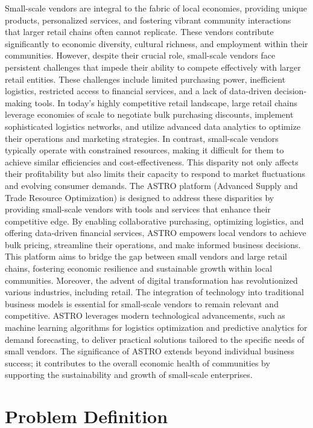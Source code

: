	Small-scale vendors are integral to the fabric of local economies, providing unique products,
	personalized services, and fostering vibrant community interactions that larger retail chains
	often cannot replicate. These vendors contribute significantly to economic diversity, cultural
	richness, and employment within their communities. However, despite their crucial role,
	small-scale vendors face persistent challenges that impede their ability to compete effectively
	with larger retail entities. These challenges include limited purchasing power, inefficient logistics,
	restricted access to financial services, and a lack of data-driven decision-making tools.
	In today’s highly competitive retail landscape, large retail chains leverage economies of scale to
	negotiate bulk purchasing discounts, implement sophisticated logistics networks, and utilize
	advanced data analytics to optimize their operations and marketing strategies. In contrast,
	small-scale vendors typically operate with constrained resources, making it difficult for them to
	achieve similar efficiencies and cost-effectiveness. This disparity not only affects their
	profitability but also limits their capacity to respond to market fluctuations and evolving
	consumer demands.
	The ASTRO platform (Advanced Supply and Trade Resource Optimization) is designed to
	address these disparities by providing small-scale vendors with tools and services that enhance
	their competitive edge. By enabling collaborative purchasing, optimizing logistics, and offering
	data-driven financial services, ASTRO empowers local vendors to achieve bulk pricing,
	streamline their operations, and make informed business decisions. This platform aims to bridge
	the gap between small vendors and large retail chains, fostering economic resilience and
	sustainable growth within local communities.
	Moreover, the advent of digital transformation has revolutionized various industries, including
	retail. The integration of technology into traditional business models is essential for small-scale
	vendors to remain relevant and competitive. ASTRO leverages modern technological
	advancements, such as machine learning algorithms for logistics optimization and predictive
	analytics for demand forecasting, to deliver practical solutions tailored to the specific needs of
	small vendors. The significance of ASTRO extends beyond individual business success; it
	contributes to the overall economic health of communities by supporting the sustainability and
	growth of small-scale enterprises.	
	
	\section{Problem Definition}
	
